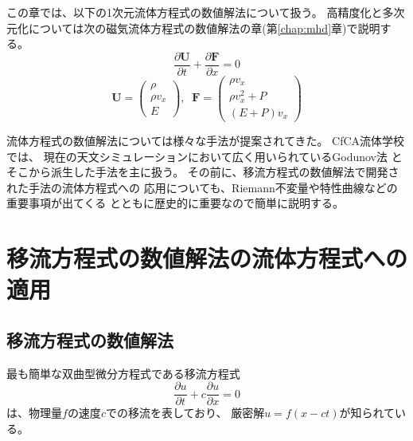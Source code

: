 この章では、以下の1次元流体方程式の数値解法について扱う。
高精度化と多次元化については次の磁気流体方程式の数値解法の章(第\ref{chap:mhd}章)で説明する。
\begin{equation}
    \frac{\partial \bm{ U}}{\partial t} 
    + \frac{\partial \bm{ F}}{\partial x}=0
\end{equation}
\begin{equation}
    \bm{ U} = \left( 
        \begin{array}{c}
            \rho \\
            \rho v_x \\
            E
    \end{array}
\right),\;\;
    \bm{ F} = \left( 
        \begin{array}{c}
            \rho v_x \\
            \rho v_x^2 + P \\
            (E + P)v_x
    \end{array}
\right)
\label{hydro1d_eq}
\end{equation}

流体方程式の数値解法については様々な手法が提案されてきた。
CfCA流体学校では、
現在の天文シミュレーションにおいて広く用いられているGodunov法
\citep{Godunov1959}とそこから派生した手法を主に扱う。
その前に、移流方程式の数値解法で開発された手法の流体方程式への
応用についても、Riemann不変量や特性曲線などの重要事項が出てくる
とともに歴史的に重要なので簡単に説明する。

\section{移流方程式の数値解法の流体方程式への適用}\label{sec:advection}

\subsection{移流方程式の数値解法}
最も簡単な双曲型微分方程式である移流方程式
\begin{equation}
    \frac{\partial u}{\partial t} + c\frac{\partial u}{\partial x}=0
    \label{advection}
\end{equation}
は、物理量$f$の速度$c$での移流を表しており、
厳密解$u=f(x-ct)$が知られている。


